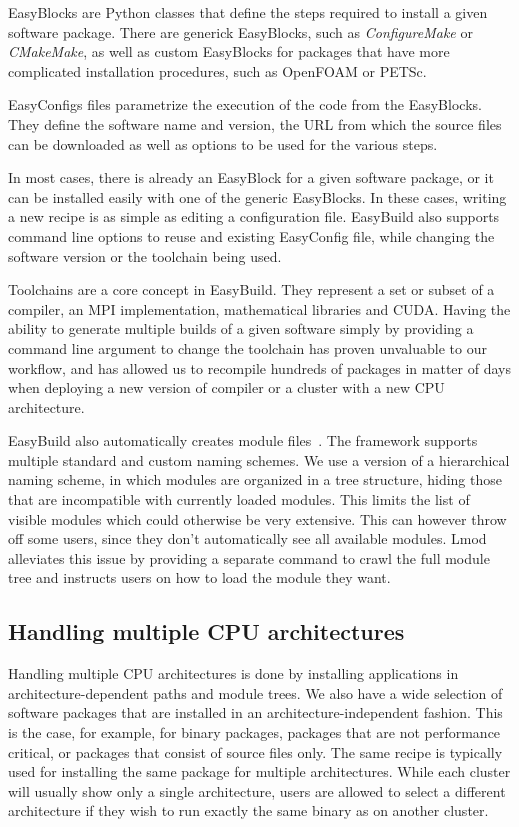 \documentclass[sigconf]{acmart}
\begin{document}
EasyBlocks are Python classes that define the steps required to install a given software package. There are generick EasyBlocks, such as {\it ConfigureMake} or {\it CMakeMake}, as well as custom EasyBlocks for packages that have more complicated installation procedures, such as OpenFOAM or PETSc. 

EasyConfigs files parametrize the execution of the code from the EasyBlocks. They define the software name and version, the URL from which the source files can be downloaded as well as options to be used for the various steps. 

In most cases, there is already an EasyBlock for a given software package, or it can be installed easily with one of the generic EasyBlocks. In these cases, writing a new recipe is as simple as editing a configuration file. EasyBuild also supports command line options to reuse and existing EasyConfig file, while changing the software version or the toolchain being used. 

Toolchains are a core concept in EasyBuild. They represent a set or subset of a compiler, an MPI implementation, mathematical libraries and CUDA. Having the ability to generate multiple builds of a given software simply by providing a command line argument to change the toolchain has proven unvaluable to our workflow, and has allowed us to recompile hundreds of packages in matter of days when deploying a new version of compiler or a cluster with a new CPU architecture. 

EasyBuild also automatically creates module files~\cite{Modules1991,Modules1996,Lmod}. The framework supports multiple standard and custom naming schemes. We use a version of a hierarchical naming scheme, in which modules are organized in a tree structure, hiding those that are incompatible with currently loaded modules. This limits the list of visible modules which could otherwise be very extensive. This can however throw off some users, since they don’t automatically see all available modules. Lmod~\cite{Lmod} alleviates this issue by providing a separate command to crawl the full module tree and instructs users on how to load the module they want.

\subsection{Handling multiple CPU architectures}
\label{sub:Handling_multiple_CPU_architectures}
Handling multiple CPU architectures is done by installing applications in architecture-dependent paths and module trees. We also have a wide selection of software packages that are installed in an architecture-independent fashion. This is the case, for example, for binary packages, packages that are not performance critical, or packages that consist of source files only. The same recipe is typically used for installing the same package for multiple architectures. While each cluster will usually show only a single architecture, users are allowed to select a different architecture if they wish to run exactly the same binary as on another cluster.
\end{document}

